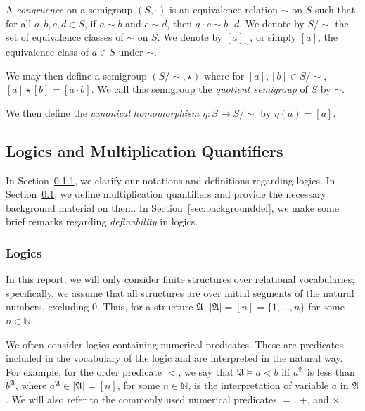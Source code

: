 \documentclass[a4paper,UKenglish,cleveref, autoref, thm-restate, anonymous]{lipics-v2021}
\begin{document}
\begin{definition}
    A \emph{congruence} on a semigroup $(S, \cdot)$ is an equivalence relation $\sim$ on $S$ such that for all $a,b,c,d \in S$, if $a \sim b$ and $c \sim d$, then $a \cdot c \sim b \cdot d$. We denote by $S/{\sim}$ the set of equivalence classes of $\sim$ on $S$. We denote by $[a]_{\sim}$, or simply $[a]$, the equivalence class of $a \in S$ under $\sim$.

    We may then define a semigroup $(S/{\sim}, \star)$ where for $[a],[b] \in S/{\sim}$, $[a] \star [b] = [a \cdot b]$. We call this semigroup the \emph{quotient semigroup} of $S$ by $\sim$.

    We then define the \emph{canonical homomorphism} $\eta : S \rightarrow S/{\sim}$ by $\eta(a) = [a]$.
\end{definition}

\subsection{Logics and Multiplication Quantifiers}\label{sec:backgroundmult}

In Section~\ref{sec:backgroundlogic}, we clarify our notations and definitions regarding logics. In Section~\ref{sec:backgroundmult}, we define multiplication quantifiers and provide the necessary background material on them. In Section~\ref{sec:backgrounddef}, we make some brief remarks regarding \emph{definability} in logics.

\subsubsection{Logics}\label{sec:backgroundlogic}

\begin{remark}
    In this report, we will only consider finite structures over relational vocabularies; specifically, we assume that all structures are over initial segments of the natural numbers, excluding $0$. Thus, for a structure $\mathfrak{A}$, $|\mathfrak{A}| = [n] = \{1, \dots, n\}$ for some $n \in \mathbb{N}$.
\end{remark}

\begin{remark}
    We often consider logics containing numerical predicates. These are predicates included in the vocabulary of the logic and are interpreted in the natural way. For example, for the order predicate $<$, we say that $\mathfrak{A} \models a < b$ iff $a^\mathfrak{A}$ is less than $b^\mathfrak{A}$, where $a^\mathfrak{A} \in |\mathfrak{A}| = [n]$, for some $n \in \mathbb{N}$, is the interpretation of variable $a$ in $\mathfrak{A}$. We will also refer to the commonly used numerical predicates $=$, $+$, and $\times$.
\end{remark}
\end{document}
